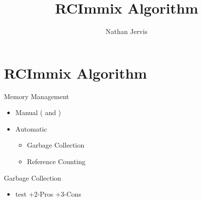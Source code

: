 \documentclass[style=paintings]{powerdot}
\title{RCImmix Algorithm}
\author{Nathan Jervis}
\begin{document}
	\maketitle

	\section{RCImmix Algorithm}

	\begin{slide}{Memory Management}
		\begin{itemize}
			\item Manual ( and )
			\item Automatic
			\begin{itemize}
				\item Garbage Collection
				\item Reference Counting
			\end{itemize}
		\end{itemize}
	\end{slide}
	
	\begin{slide}{Garbage Collection}
		\begin{itemize}
			\item test
			\onslide+{2-}{Pros}
			\onslide+{3-}{Cons}
		\end{itemize}
	\end{slide}
\end{document}
